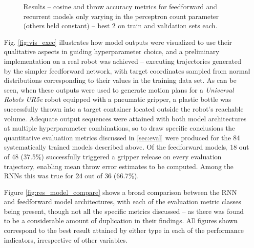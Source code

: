 \documentclass{article}
\begin{document}
\begin{figure}[!hbt]
	\centering
	\caption{Results -- cosine and throw accuracy metrics for feedforward and recurrent models only varying in the perceptron count parameter (others held constant) -- best 2 on train and validation sets each.}
	\label{fig:ind_rnn_naive}
\end{figure}

Fig. \ref{fig:vis_exec} illustrates how model outputs were visualized to use their qualitative aspects in guiding hyperparameter choice, and a preliminary implementation on a real robot was achieved -- executing trajectories generated by the simpler feedforward network, with target coordinates sampled from normal distributions corresponding to their values in the training data set. As can be seen, when these outputs were used to generate motion plans for a \emph{Universal Robots UR5e} robot equipped with a pneumatic gripper, a plastic bottle was successfully thrown into a target container located outside the robot's reachable volume. Adequate output sequences were attained with both model architectures at multiple hyperparameter combinations, so to draw specific conclusions the quantitative evaluation metrics discussed in \ref{sec:eval} were produced for the 84 systematically trained models described above. Of the feedforward models, 18 out of 48 (37.5\%) successfully triggered a gripper release on every evaluation trajectory, enabling mean throw error estimates to be computed. Among the RNNs this was true for 24 out of 36 (66.7\%).


Figure \ref{fig:res_model_compare} shows a broad comparison between the RNN and feedforward model architectures, with each of the evaluation metric classes being present, though not all the specific metrics discussed -- as there was found to be a considerable amount of duplication in their findings. All figures shown correspond to the best result attained by either type in each of the performance indicators, irrespective of other variables. 
\end{document}
